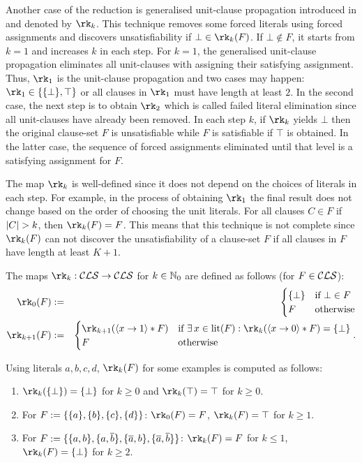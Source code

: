 \documentclass[]{book}
\begin{document}
Another case of the reduction is generalised unit-clause propagation introduced in \cite{h10} and denoted by $\rk_k$. This technique removes some forced literals using forced assignments and discovers unsatisfiability if $\bot \in \rk_k(F)$. If $\bot \not \in F$, it starts from $k=1$ and increases $k$ in each step. For $k=1$, the generalised unit-clause propagation eliminates all unit-clauses with assigning their satisfying assignment. Thus, $\rk_1$ is the unit-clause propagation and two cases may happen:  $\rk_1 \in \set{\set{\bot},\top}$ or all clauses in $\rk_1$ must have length at least $2$. In the second case, the next step is to obtain $\rk_2$ which is called failed literal elimination since all unit-clauses have already been removed. In each step $k$, if $\rk_k$ yields $\bot$ then the original clause-set $F$ is unsatisfiable while $F$ is satisfiable if $\top$ is obtained. In the latter case, the sequence of forced assignments eliminated until that level is a satisfying assignment for $F$.

The map $\rk_k$ is well-defined since it does not depend on the choices of literals in each step. For example, in the process of obtaining  $\rk_1$ the final result does not change based on the order of choosing the unit literals. For all clauses $C \in F$ if $\lvert C \rvert > k$, then $\rk_k(F) = F$. This means that this technique is not complete since $\rk_k(F)$ can not discover the unsatisfiability of a clause-set $F$ if all clauses in $F$ have length at least $K+1$.

\begin{defi}\label{def:rk}
\cite{h10} The maps $\rk_k: \Cls \ra \Cls$ for $k \in \mathbb{N}_0$ are defined as follows (for $F \in \mathcal{CLS}$):
  \begin{eqnarray*}
  \rk_0(F) & := &
  \begin{cases}
  \set{\bot} & \text{if } \bot \in F\\ F & \text{otherwise}
  \end{cases}\\
  \rk_{k+1}(F) & := &
  \begin{cases}
  \rk_{k+1}(\pao x1 * F) & \text{if } \ex\, x \in \lit(F) : \rk_k(\pao x0 * F) = \set{\bot}\\ F & \text{otherwise}
  \end{cases}.
  \end{eqnarray*}
\end{defi}

\begin{examp}\label{exp:rk}
Using literals $a,b,c,d$, $\rk_k(F)$ for some examples is computed as follows:
  \begin{enumerate}
  \item $\rk_k(\set{\bot}) = \set{\bot}$ for $k \ge 0$ and $\rk_k(\top) = \top$ for $k \ge 0$.
  \item For $F := \{ \{ a \},\{ b \},\{ c \},\{ d \} \}$: $\rk_0(F) = F$, $\rk_k(F) = \top$ for $k \ge 1$.
  \item For $F := \{ \{ a,b \},\{ a,\overline{b} \}, \{ \overline{a},b \},\{ \overline{a},\overline{b} \} \}$: $\rk_k(F) = F$ for $k \le 1$, $\rk_k(F) = \set{\bot}$ for $k \ge 2$.
  \end{enumerate}
\end{examp}
\end{document}
